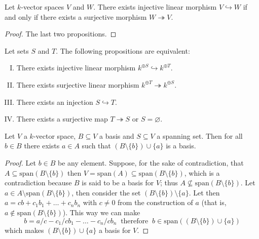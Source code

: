 \begin{proposition}
  Let \(k\)-vector spaces \(V\) and \(W\). There exists injective linear
  morphism \(V \hookrightarrow W\) if and only if there exists a surjective
  morphism \(W \twoheadrightarrow V\).
\end{proposition}

\begin{proof}
  The last two propositions.
\end{proof}

\begin{theorem}\label{thm: iso of basis}
  Let sets \(S\) and \(T\). The following propositions are equivalent:
  \begin{enumerate}[I.]
    \item There exists injective linear morphism \(k^{\oplus S} \hookrightarrow
      k^{\oplus T}\).
    \item There exists surjective linear morphism \(k^{\oplus T}
      \twoheadrightarrow k^{\oplus S}\).
    \item There exists an injection \(S \hookrightarrow T\).
    \item There exists a surjective map \(T \twoheadrightarrow S\) or \(S =
      \varnothing\).
  \end{enumerate}
\end{theorem}

\begin{lemma}
  Let \(V\) a \(k\)-vector space, \(B \subseteq V\) a basis and \(S \subseteq
  V\) a spanning set. Then for all \(b \in B\) there exists \(a \in A\) such
  that \((B \setminus \{b\}) \cup \{a\}\) is a basis.
\end{lemma}

\begin{proof}
  Let \(b \in B\) be any element. Suppose, for the sake of contradiction, that
  \(A \subseteq \mathrm{span}(B \setminus \{b\})\) then \(V = \mathrm{span}(A)
  \subseteq \mathrm{span}(B \setminus \{b\})\), which is a contradiction because
  \(B\) is said to be a basis for \(V\); thus \(A \not\subseteq
  \mathrm{span}(B\setminus \{b\})\). Let \(a \in A \setminus \mathrm{span}(B
  \setminus \{b\})\), then consider the set \((B \setminus \{b\}) \setminus
  \{a\}\). Let then \(a = cb + c_1 b_1 + \dots + c_n b_n\) with \(c \neq 0\)
  from the construction of \(a\) (that is, \(a \not\in \mathrm{span}(B
  \setminus \{b\})\)). This way we can make
  \[
    b = a/c - c_1/c b_1 - \dots - c_n/c b_n\
    \text{ therefore }\ b \in \mathrm{span}((B \setminus \{b\}) \cup \{a\})
  \]
  which makes \((B \setminus \{b\}) \cup \{a\}\) a basis for \(V\).
\end{proof}

